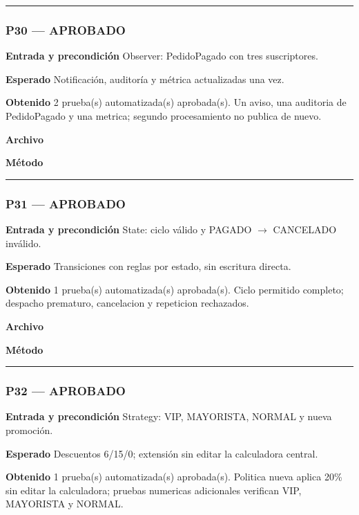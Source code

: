 \medskip\hrule\medskip
\subsubsection*{P30 --- APROBADO}
\textbf{Entrada y precondición} Observer: PedidoPagado con tres suscriptores.

\textbf{Esperado} Notificación, auditoría y métrica actualizadas una vez.

\textbf{Obtenido} 2 prueba(s) automatizada(s) aprobada(s). Un aviso, una auditoria de PedidoPagado y una metrica; segundo procesamiento no publica de nuevo.

\textbf{Archivo} \href{https://github.com/Alan77-bot/LogiMarket360Alan/blob/68bda51063441415524ede51bdf61649ee9b4973/tests/LogiMarket.Tests/Integracion/OutboxTests.cs}{}

\textbf{Método} 

\medskip\hrule\medskip
\subsubsection*{P31 --- APROBADO}
\textbf{Entrada y precondición} State: ciclo válido y PAGADO $\rightarrow$ CANCELADO inválido.

\textbf{Esperado} Transiciones con reglas por estado, sin escritura directa.

\textbf{Obtenido} 1 prueba(s) automatizada(s) aprobada(s). Ciclo permitido completo; despacho prematuro, cancelacion y repeticion rechazados.

\textbf{Archivo} \href{https://github.com/Alan77-bot/LogiMarket360Alan/blob/68bda51063441415524ede51bdf61649ee9b4973/tests/LogiMarket.Tests/Dominio/EstadosTests.cs}{}

\textbf{Método} 

\medskip\hrule\medskip
\subsubsection*{P32 --- APROBADO}
\textbf{Entrada y precondición} Strategy: VIP, MAYORISTA, NORMAL y nueva promoción.

\textbf{Esperado} Descuentos 6/15/0; extensión sin editar la calculadora central.

\textbf{Obtenido} 1 prueba(s) automatizada(s) aprobada(s). Politica nueva aplica 20\% sin editar la calculadora; pruebas numericas adicionales verifican VIP, MAYORISTA y NORMAL.

